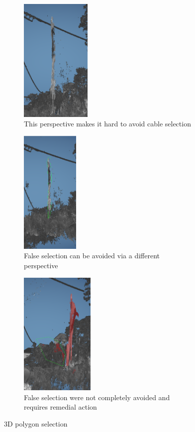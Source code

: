 \begin{figure}
\centering
\begin{subfigure}{.33\textwidth}
  \centering
  \includegraphics[height=6cm]{images/3dselect/1.png}
  \captionsetup{margin=5pt}
  \caption{This perspective makes it hard to avoid cable selection}
\end{subfigure}%
\begin{subfigure}{.33\textwidth}
  \centering
  \includegraphics[height=6cm]{images/3dselect/2.png}
  \captionsetup{margin=5pt}
  \caption{False selection can be avoided via a different perspective}
\end{subfigure}
\begin{subfigure}{.33\textwidth}
  \centering
  \includegraphics[height=6cm]{images/3dselect/3.png}
  \captionsetup{margin=5pt}
  \caption{False selection were not completely avoided and requires remedial action}
\end{subfigure}
\caption{3D polygon selection}\label{fig:3dselect}
\end{figure}


